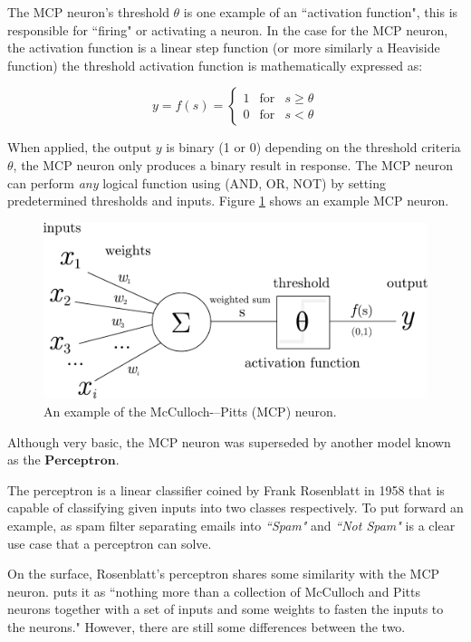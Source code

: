 \documentclass[report, 11pt, oneside]{dissertation}
\begin{document}
The MCP neuron's threshold $ \theta $ is one example of an ``activation function", this is responsible for  ``firing" or activating a neuron. In the case for the MCP neuron, the activation function is a linear step  function (or more similarly a Heaviside function) \autocite[9]{wang:2017} the threshold activation function is mathematically expressed as:

\begin{equation} \label{eq:2}
{\displaystyle y = f(s)=\left\{{\begin{array}{rcl}1&{\mbox{for}}&s\geq\theta\\0&{\mbox{for}}&s< \theta\end{array}}\right.}
\end{equation}


When applied, the output $ y $ is binary (1 or 0) depending on the threshold criteria $ \theta $, the MCP neuron only produces a binary result in response. The MCP neuron can perform \textit{any} logical function using (AND, OR, NOT) by setting predetermined thresholds and inputs. Figure \ref{fig:mcpneuron} shows an example MCP neuron.

\begin{figure}[!htb]
	\centering
	\includegraphics[scale=0.5]{figure_1}
	\caption{An example of the McCulloch-–Pitts (MCP) neuron.}
	\label{fig:mcpneuron}
\end{figure}

 Although very basic, the MCP neuron was superseded by another model known as the $ \textbf{Perceptron} $.

The perceptron is a linear classifier coined by Frank Rosenblatt in 1958 that is capable of classifying given inputs into two classes respectively. To put forward an example, as spam filter separating emails into \textit{``Spam"} and \textit{``Not Spam"} is a clear use case that a perceptron can solve.

On the surface, Rosenblatt's perceptron shares some similarity with the MCP neuron. \citep[43]{Marsland:2014:MLA:2692349} puts it as ``nothing more than a collection of McCulloch and Pitts neurons together with a set of inputs and some weights to fasten the inputs to the neurons." However, there are still some differences between the two.
\end{document}
